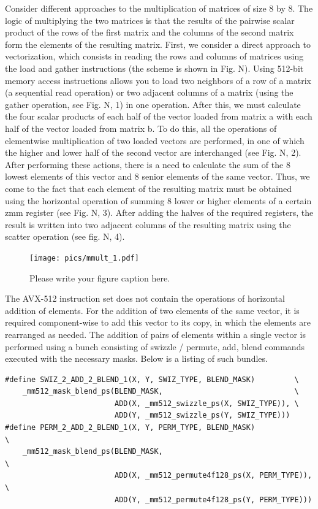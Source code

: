 \documentclass[
11pt,%
tightenlines,%
twoside,%
onecolumn,%
nofloats,%
nobibnotes,%
nofootinbib,%
superscriptaddress,%
noshowpacs,%
centertags]%
{revtex4}
\begin{document}
Consider different approaches to the multiplication of matrices of size 8 by 8. The logic of multiplying the two matrices is that the results of the pairwise scalar product of the rows of the first matrix and the columns of the second matrix form the elements of the resulting matrix. First, we consider a direct approach to vectorization, which consists in reading the rows and columns of matrices using the load and gather instructions (the scheme is shown in Fig. N). Using 512-bit memory access instructions allows you to load two neighbors of a row of a matrix (a sequential read operation) or two adjacent columns of a matrix (using the gather operation, see Fig. N, 1) in one operation. After this, we must calculate the four scalar products of each half of the vector loaded from matrix a with each half of the vector loaded from matrix b. To do this, all the operations of elementwise multiplication of two loaded vectors are performed, in one of which the higher and lower half of the second vector are interchanged (see Fig. N, 2). After performing these actions, there is a need to calculate the sum of the 8 lowest elements of this vector and 8 senior elements of the same vector. Thus, we come to the fact that each element of the resulting matrix must be obtained using the horizontal operation of summing 8 lower or higher elements of a certain zmm register (see Fig. N, 3). After adding the halves of the required registers, the result is written into two adjacent columns of the resulting matrix using the scatter operation (see fig. N, 4).

\begin{figure}[h]
\setcaptionmargin{5mm}
\onelinecaptionstrue  %
\texttt{[image: pics/mmult\_1.pdf]}
\caption{Please write your figure caption here.}\label{fig:1}
\end{figure}

The AVX-512 instruction set does not contain the operations of horizontal addition of elements. For the addition of two elements of the same vector, it is required component-wise to add this vector to its copy, in which the elements are rearranged as needed. The addition of pairs of elements within a single vector is performed using a bunch consisting of swizzle / permute, add, blend commands executed with the necessary masks. Below is a listing of such bundles.

\begin{lstlisting}
#define SWIZ_2_ADD_2_BLEND_1(X, Y, SWIZ_TYPE, BLEND_MASK)         \
    _mm512_mask_blend_ps(BLEND_MASK,                              \
                         ADD(X, _mm512_swizzle_ps(X, SWIZ_TYPE)), \
                         ADD(Y, _mm512_swizzle_ps(Y, SWIZ_TYPE)))
#define PERM_2_ADD_2_BLEND_1(X, Y, PERM_TYPE, BLEND_MASK)              \
    _mm512_mask_blend_ps(BLEND_MASK,                                   \
                         ADD(X, _mm512_permute4f128_ps(X, PERM_TYPE)), \
                         ADD(Y, _mm512_permute4f128_ps(Y, PERM_TYPE)))

\end{lstlisting}
\end{document}
